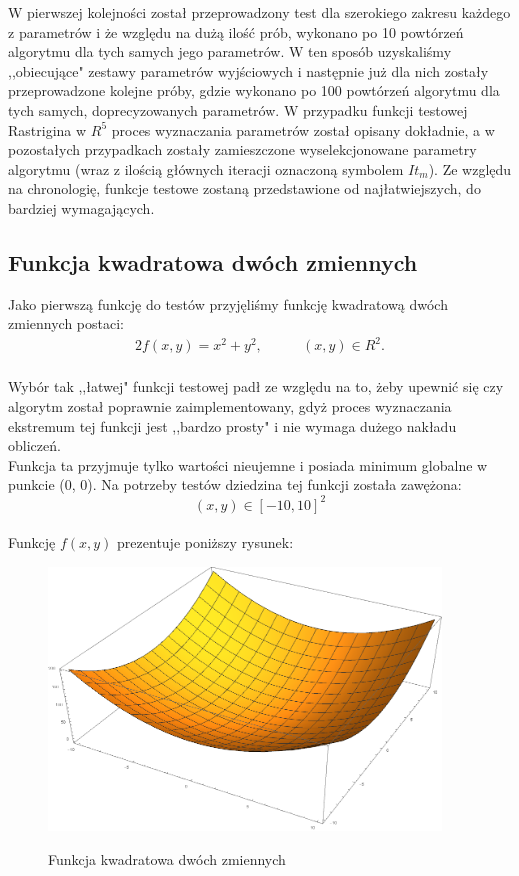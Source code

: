 \documentclass[twoside]{projektInzynierskiMS1}
\newcommand{\si}{ś}
\begin{document}
W pierwszej kolejno\si ci został przeprowadzony test dla szerokiego zakresu każdego z parametrów i że względu na dużą ilo\si ć prób, wykonano po 10 powtórzeń algorytmu dla tych samych jego parametrów. W ten sposób uzyskali\si my ,,obiecujące" zestawy parametrów wyj\si ciowych i następnie już dla nich zostały przeprowadzone kolejne próby, gdzie wykonano po 100 powtórzeń algorytmu dla tych samych, doprecyzowanych parametrów. W przypadku funkcji testowej Rastrigina w $R^5$ proces wyznaczania parametrów został opisany dokładnie, a w pozostałych przypadkach zostały zamieszczone wyselekcjonowane parametry algorytmu (wraz z ilo\si cią głównych iteracji oznaczoną symbolem $It_m$). Ze względu na chronologię, funkcje testowe zostaną przedstawione od najłatwiejszych, do bardziej wymagających.



	\subsection{Funkcja kwadratowa dwóch zmiennych}
	Jako pierwszą funkcję do testów przyjęli\si my funkcję kwadratową dwóch zmiennych postaci:
\begin{alignat*}{2}
f(x, y) = x^2 + y^2,&\qquad  (x, y) \in R^2.\\
\end{alignat*}

Wybór tak ,,łatwej" funkcji testowej padł ze względu na to, żeby upewnić się czy algorytm został poprawnie zaimplementowany, gdyż proces wyznaczania ekstremum tej funkcji jest ,,bardzo prosty" i nie wymaga dużego nakładu obliczeń. \\

Funkcja ta przyjmuje tylko warto\si ci nieujemne i posiada minimum globalne w punkcie (0, 0). Na potrzeby testów dziedzina tej funkcji została zawężona:
\[(x, y)  \in [-10,10]^2 \]\\ 


Funkcję $f(x, y)$ prezentuje poniższy rysunek:\\
\begin{figure}[H]
	\begin{center}
		\includegraphics[height=7cm]{pics/quadraticFunction1.png}\\
	\end{center}
	\caption{Funkcja kwadratowa dwóch zmiennych}
\end{figure}
\end{document}
